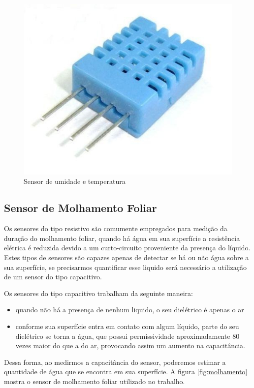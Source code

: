 \begin{figure}[H]
\centering
\includegraphics[scale=0.3]{./04-figuras/sensor_DHT11.jpg}
\caption{Sensor de umidade e temperatura}
\vspace{-\baselineskip}
\label{fig:dht11}
\end{figure}


\subsection{Sensor de Molhamento Foliar}

Os sensores do tipo resistivo são comumente empregados para medição da duração do molhamento foliar, quando há água em sua superfície a resistência elétrica é reduzida devido a um curto-circuito proveniente da presença do líquido. Estes tipos de sensores são capazes apenas de detectar se há ou não água sobre a sua superfície, se precisarmos quantificar esse liquido será necessário a utilização de um sensor do tipo capacitivo.

Os sensores do tipo capacitivo trabalham da seguinte maneira:
\begin{itemize}[itemsep=0em]
\item quando não há a presença de nenhum liquido, o seu dielétrico é apenas o ar
\item conforme sua superfície entra em contato com algum líquido, parte do seu dielétrico se torna a água, que possui permissividade aproximadamente 80 vezes maior do que a do ar, provocando assim um aumento na capacitância. 
\end{itemize}
Dessa forma, ao medirmos a capacitância do sensor, poderemos estimar a quantidade de água que se encontra em sua superfície.
A figura \ref{fig:molhamento} mostra o sensor de molhamento foliar utilizado no trabalho.

